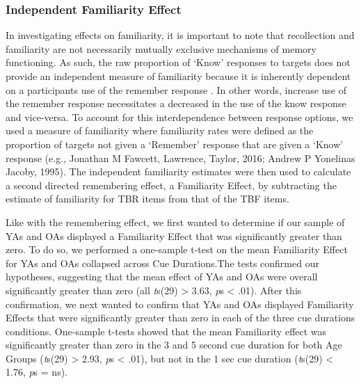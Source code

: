 \documentclass[man]{apa6}
\begin{document}
\subsubsection{Independent Familiarity Effect}

In investigating effects on familiarity, it is important to note that recollection and familiarity are not necessarily mutually exclusive mechanisms of memory functioning. As such, the raw proportion of ‘Know’ responses to targets does not provide an independent measure of familiarity because it is inherently dependent on a participants use of the remember response \parencite[see][]{jacoby.yonelinas.jennings1997,yonelinas.jacoby1995remknow}. In other words, increase use of the remember response necessitates a decreased in the use of the know response and vice-versa. To account for this interdependence between response options, we used a  measure of familiarity where familiarity rates were defined as the proportion of targets not given a ‘Remember’ response that are given a ‘Know’ response \parencite{yonelinas.jacoby1995remknow}(e.g., Jonathan M Fawcett, Lawrence,  Taylor, 2016; Andrew P Yonelinas  Jacoby, 1995). The independent familiarity estimates were then used to calculate a second directed remembering effect, a Familiarity Effect, by subtracting the estimate of familiarity for TBR items from that of the TBF items.

Like with the remembering effect, we first wanted to determine if our sample of YAs and OAs displayed a Familiarity Effect that was significantly greater than zero. To do so, we performed a one-sample t-test on the mean Familiarity Effect for YAs and OAs collapsed across Cue Durations.The tests confirmed our hypotheses, suggesting that the mean effect of YAs and OAs were overall significantly greater than zero (all \textit{t}s(29) > 3.63, \textit{p}s < .01). After this confirmation, we next wanted to confirm that YAs and OAs displayed Familiarity Effects that were significantly greater than zero in each of the three cue durations conditions. One-sample t-tests showed that the mean Familiarity effect was significantly greater than zero in the 3 and 5 second cue duration for both Age Groups (\textit{t}s(29) > 2.93, \textit{p}s < .01), but not in the 1 sec cue duration (\textit{t}s(29) < 1.76, \textit{p}s = ns).
\end{document}
